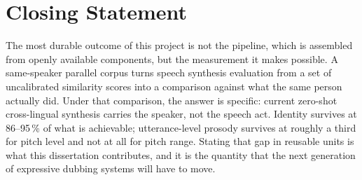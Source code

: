 \section{Closing Statement}
\label{sec:closing}

The most durable outcome of this project is not the pipeline, which is assembled from openly
available components, but the measurement it makes possible. A same-speaker parallel corpus turns
speech synthesis evaluation from a set of uncalibrated similarity scores into a comparison against
what the same person actually did. Under that comparison, the answer is specific: current zero-shot
cross-lingual synthesis carries the speaker, not the speech act. Identity survives at 86--95\,\% of
what is achievable; utterance-level prosody survives at roughly a third for pitch level and not at
all for pitch range. Stating that gap in reusable units is what this dissertation contributes, and
it is the quantity that the next generation of expressive dubbing systems will have to move.
